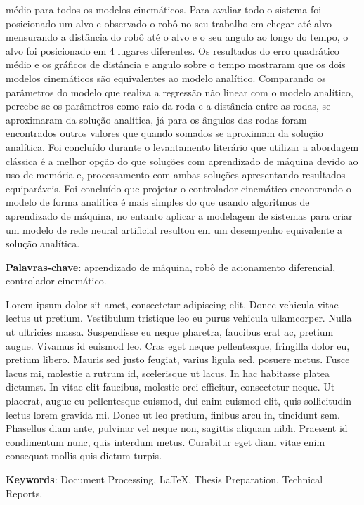 médio para todos os modelos cinemáticos.
Para avaliar todo o sistema foi posicionado um alvo e observado o robô no 
seu trabalho em chegar até alvo mensurando a distância do robô até o
alvo e o seu angulo ao longo do tempo, o alvo foi posicionado em 4 lugares
diferentes. Os resultados do erro quadrático médio e os
gráficos de distância e angulo sobre o tempo 
mostraram que os dois modelos cinemáticos são equivalentes ao modelo
analítico. Comparando os parâmetros do modelo que realiza a
regressão não linear com o modelo analítico,
percebe-se os parâmetros como raio da roda e a distância entre as rodas,
se aproximaram da solução analítica, já para os ângulos das rodas foram
encontrados outros valores que quando somados se aproximam da solução
analítica. Foi concluído durante o levantamento literário que
utilizar a abordagem clássica é a melhor opção do que soluções com
aprendizado de máquina devido ao uso de memória e,
processamento com ambas soluções apresentando resultados equiparáveis.
Foi concluído que projetar o controlador cinemático encontrando o modelo
de forma analítica é mais simples do que usando algoritmos de aprendizado
de máquina, no entanto aplicar a modelagem  de sistemas para criar um
modelo de rede neural artificial resultou em um desempenho equivalente
a solução analítica.




\vspace{1.5ex}

{\bf Palavras-chave}: aprendizado de máquina, robô de acionamento diferencial,
controlador cinemático.

%
%

Lorem ipsum dolor sit amet, consectetur adipiscing elit. Donec vehicula vitae lectus ut pretium. Vestibulum tristique leo eu purus vehicula ullamcorper. Nulla ut ultricies massa. Suspendisse eu neque pharetra, faucibus erat ac, pretium augue. Vivamus id euismod leo. Cras eget neque pellentesque, fringilla dolor eu, pretium libero. Mauris sed justo feugiat, varius ligula sed, posuere metus. Fusce lacus mi, molestie a rutrum id, scelerisque ut lacus. In hac habitasse platea dictumst. In vitae elit faucibus, molestie orci efficitur, consectetur neque. Ut placerat, augue eu pellentesque euismod, dui enim euismod elit, quis sollicitudin lectus lorem gravida mi. Donec ut leo pretium, finibus arcu in, tincidunt sem. Phasellus diam ante, pulvinar vel neque non, sagittis aliquam nibh. Praesent id condimentum nunc, quis interdum metus. Curabitur eget diam vitae enim consequat mollis quis dictum turpis.

\vspace{1.5ex}

{\bf Keywords}: Document Processing, \LaTeX, Thesis Preparation,
Technical Reports.
